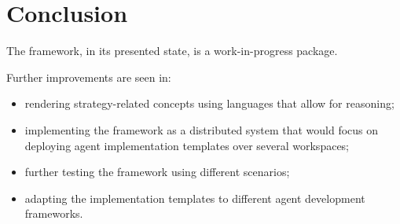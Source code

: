 \section{Conclusion}

\begin{frame}{\insertsection}
    The framework, in its presented state, is a \alert{work-in-progress} package.

    Further improvements are seen in:
    \begin{itemize}
        \item rendering strategy-related concepts using languages that allow for reasoning;
        \item implementing the framework as a distributed system that would focus on deploying agent implementation templates over several workspaces;
        \item further testing the framework using different scenarios;
        \item adapting the implementation templates to different agent development frameworks.
    \end{itemize}
\end{frame}